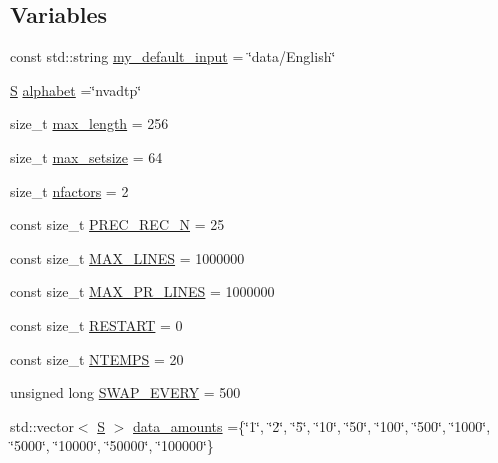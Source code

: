 \subsection*{Variables}
\begin{DoxyCompactItemize}
\item 
const std\+::string \hyperlink{_models_2_formal_language_theory-_complex_2main_8cpp_aff5a98e66ee22e2c2547530190ecfd3d}{my\+\_\+default\+\_\+input} = \char`\"{}data/English\char`\"{}
\item 
\hyperlink{_models_2_formal_language_theory-_complex_2main_8cpp_a51c40915539205f0b5add30b0d68a4cb}{S} \hyperlink{_models_2_formal_language_theory-_complex_2main_8cpp_ad762aabf5f551e4c7632fb389b3e2209}{alphabet} =\char`\"{}nvadtp\char`\"{}
\item 
size\+\_\+t \hyperlink{_models_2_formal_language_theory-_complex_2main_8cpp_aa94da4036d516add23ae35c670300c32}{max\+\_\+length} = 256
\item 
size\+\_\+t \hyperlink{_models_2_formal_language_theory-_complex_2main_8cpp_aafa4cc7b8a249ecb81ad63ca7a2a6150}{max\+\_\+setsize} = 64
\item 
size\+\_\+t \hyperlink{_models_2_formal_language_theory-_complex_2main_8cpp_abbce8dbfea6f30b87265ddd94cb933f7}{nfactors} = 2
\item 
const size\+\_\+t \hyperlink{_models_2_formal_language_theory-_complex_2main_8cpp_a948185958f7efc05b85ac4084d82e3b9}{P\+R\+E\+C\+\_\+\+R\+E\+C\+\_\+N} = 25
\item 
const size\+\_\+t \hyperlink{_models_2_formal_language_theory-_complex_2main_8cpp_a40344102d720622016c257aa59a33b6d}{M\+A\+X\+\_\+\+L\+I\+N\+ES} = 1000000
\item 
const size\+\_\+t \hyperlink{_models_2_formal_language_theory-_complex_2main_8cpp_a5923038d8dfed7c8eaac4111396b490f}{M\+A\+X\+\_\+\+P\+R\+\_\+\+L\+I\+N\+ES} = 1000000
\item 
const size\+\_\+t \hyperlink{_models_2_formal_language_theory-_complex_2main_8cpp_ada34ee41f51e229e0d5e00b99aed5991}{R\+E\+S\+T\+A\+RT} = 0
\item 
const size\+\_\+t \hyperlink{_models_2_formal_language_theory-_complex_2main_8cpp_a6aa2c568bc3a4f1e1f586980b31b6699}{N\+T\+E\+M\+PS} = 20
\item 
unsigned long \hyperlink{_models_2_formal_language_theory-_complex_2main_8cpp_a30d8f792c547d6073063d862794d030a}{S\+W\+A\+P\+\_\+\+E\+V\+E\+RY} = 500
\item 
std\+::vector$<$ \hyperlink{_models_2_formal_language_theory-_complex_2main_8cpp_a51c40915539205f0b5add30b0d68a4cb}{S} $>$ \hyperlink{_models_2_formal_language_theory-_complex_2main_8cpp_acb338cf650cba49a5be5dabfffad0dbd}{data\+\_\+amounts} =\{\char`\"{}1\char`\"{}, \char`\"{}2\char`\"{}, \char`\"{}5\char`\"{}, \char`\"{}10\char`\"{}, \char`\"{}50\char`\"{}, \char`\"{}100\char`\"{}, \char`\"{}500\char`\"{}, \char`\"{}1000\char`\"{}, \char`\"{}5000\char`\"{}, \char`\"{}10000\char`\"{}, \char`\"{}50000\char`\"{}, \char`\"{}100000\char`\"{}\}

\end{DoxyCompactItemize}
